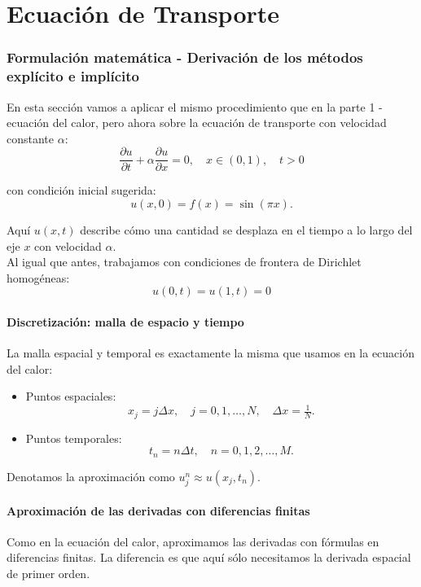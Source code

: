 \documentclass[12pt,a4paper]{article}
\begin{document}
\part{Ecuación de Transporte}

\section{Formulación matemática - Derivación de los métodos explícito e implícito}

En esta sección vamos a aplicar el mismo procedimiento que en la parte 1 - ecuación del calor, pero ahora sobre la ecuación de transporte con velocidad constante $\alpha$:
\[
\frac{\partial u}{\partial t} + \alpha \frac{\partial u}{\partial x} = 0,
\quad x \in (0,1), \quad t > 0
\]

con condición inicial sugerida:
\[
u(x,0) = f(x) = \sin(\pi x).
\]

Aquí $u(x,t)$ describe cómo una cantidad se desplaza en el tiempo a lo largo del eje $x$ con velocidad $\alpha$. \\

Al igual que antes, trabajamos con condiciones de frontera de Dirichlet homogéneas:
\[
u(0,t)=u(1,t)=0
\]

\subsection{Discretización: malla de espacio y tiempo}

La malla espacial y temporal es exactamente la misma que usamos en la ecuación del calor:

\begin{itemize}
    \item Puntos espaciales:
    \[
    x_j = j \Delta x, \quad j = 0,1,\dots,N, \quad \Delta x = \tfrac{1}{N}.
    \]

    \item Puntos temporales:
    \[
    t_n = n\Delta t, \quad n = 0,1,2,\dots,M.
    \]
\end{itemize}

Denotamos la aproximación como $u_j^n \approx u(x_j,t_n)$.

\subsection{Aproximación de las derivadas con diferencias finitas}

Como en la ecuación del calor, aproximamos las derivadas con fórmulas en diferencias finitas.  
La diferencia es que aquí sólo necesitamos la derivada espacial de primer orden.
\end{document}
